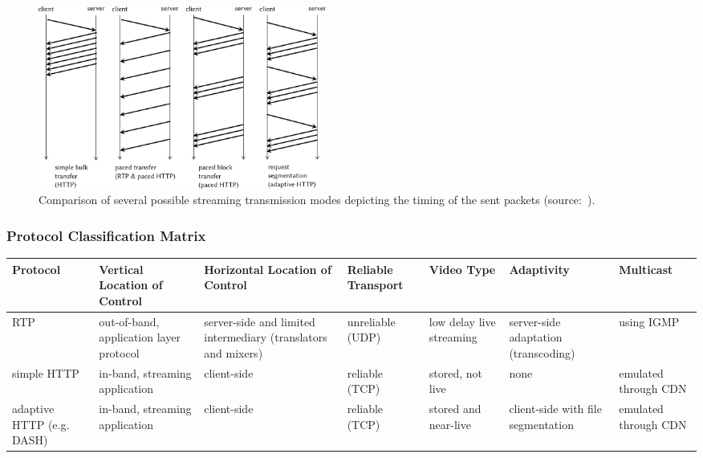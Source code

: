 \documentclass{beamer}
\begin{document}
\begin{frame}
	\begin{figure}
		\centering
		\includegraphics[height=6cm]{../../chapters/03-streaming/images/streaming-transfer-modes.pdf}
		\caption{Comparison of several possible streaming transmission modes depicting the timing of the sent packets (source:~\cite{ma2011mobile}).}
	\end{figure}
\end{frame}


\begin{frame}
	\frametitle{Protocol Classification Matrix}
{
\scriptsize
\begin{tabu}{X[0.8]XX[1.2]XXXX[0.85]} 
	\toprule
	\textbf{Protocol} & \textbf{Vertical Location of Control} & \textbf{Horizontal Location of Control} & \textbf{Reliable Transport} & \textbf{Video Type} & \textbf{Adaptivity} & \textbf{Multicast} \\ 
	\midrule
	RTP & out-of-band, application layer protocol & server-side and limited intermediary (translators and mixers) & unreliable (UDP) & low delay live streaming & server-side adaptation (transcoding) & using IGMP\\
	simple HTTP & in-band, streaming application & client-side & reliable (TCP) & stored, not live & none & emulated through CDN\\
	adaptive HTTP (e.g. DASH) & in-band, streaming application & client-side & reliable (TCP) & stored and near-live & client-side with file segmentation & emulated through CDN\\
	\bottomrule
\end{tabu}
}
\end{frame}
\end{document}
